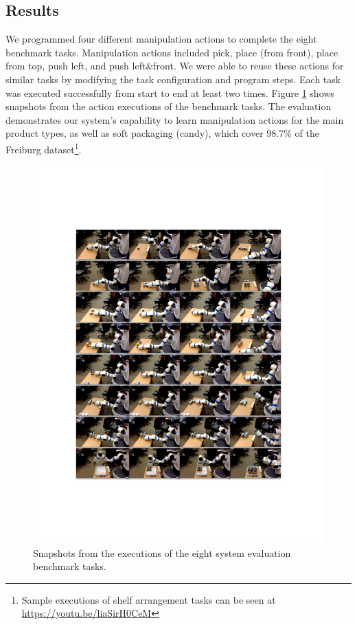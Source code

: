 \subsection{Results}
We programmed four different manipulation actions to complete the eight benchmark tasks. 
Manipulation actions included pick, place (from front), place from top, push left, and push left\&front.
We were able to reuse these actions for similar tasks by modifying the task configuration and program steps.
Each task was executed successfully from start to end at least two times.
Figure \ref{fig:ppp-can} shows snapshots from the action executions of the benchmark tasks.
The evaluation demonstrates our system's capability to learn manipulation actions for the main product types, as well as soft packaging (\eg candy), which cover 98.7\% of the Freiburg dataset\footnote{Sample executions of shelf arrangement tasks can be seen at \url{https://youtu.be/liaSirH0CeM}}. 

\begin{figure}
	\includegraphics[width=\linewidth]{figures/frames}
	\caption{Snapshots from the executions of the eight system evaluation benchmark tasks.}
	\label{fig:ppp-can}
\end{figure}


